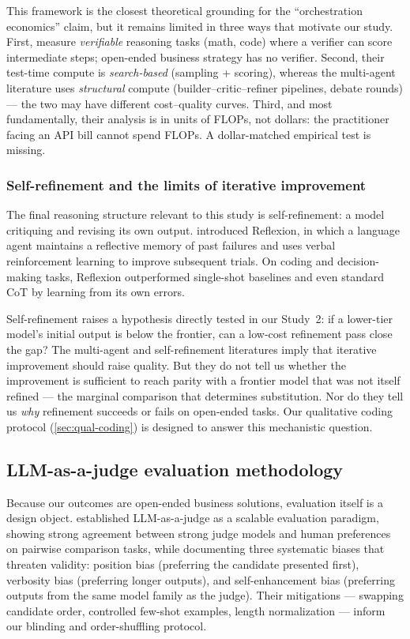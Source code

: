 \documentclass[12pt,a4paper]{article}
\begin{document}
This framework is the closest theoretical grounding for the ``orchestration
economics'' claim, but it remains limited in three ways that motivate our study.
First, \citet{SnellEtAl2024} measure \emph{verifiable} reasoning tasks (math,
code) where a verifier can score intermediate steps; open-ended business
strategy has no verifier. Second, their test-time compute is
\emph{search-based} (sampling + scoring), whereas the multi-agent literature
uses \emph{structural} compute (builder--critic--refiner pipelines, debate
rounds) --- the two may have different cost--quality curves. Third, and most
fundamentally, their analysis is in units of FLOPs, not dollars: the
practitioner facing an API bill cannot spend FLOPs. A dollar-matched empirical
test is missing.

\subsubsection{Self-refinement and the limits of iterative improvement}

The final reasoning structure relevant to this study is self-refinement: a
model critiquing and revising its own output. \citet{ShinnEtAl2023} introduced
Reflexion, in which a language agent maintains a reflective memory of past
failures and uses verbal reinforcement learning to improve subsequent trials.
On coding and decision-making tasks, Reflexion outperformed single-shot
baselines and even standard CoT by learning from its own errors.

Self-refinement raises a hypothesis directly tested in our Study~2: if a lower-tier
model's initial output is below the frontier, can a low-cost refinement pass close
the gap? The multi-agent and self-refinement literatures imply that iterative
improvement should raise quality. But they do not tell us whether the
improvement is sufficient to reach parity with a frontier model that was not
itself refined --- the marginal comparison that determines substitution. Nor do
they tell us \emph{why} refinement succeeds or fails on open-ended tasks. Our
qualitative coding protocol (\cref{sec:qual-coding}) is designed to answer this
mechanistic question.

\subsection{LLM-as-a-judge evaluation methodology}

Because our outcomes are open-ended business solutions, evaluation itself is a
design object. \citet{ZhengEtAl2023} established LLM-as-a-judge as a scalable
evaluation paradigm, showing strong agreement between strong judge models and
human preferences on pairwise comparison tasks, while documenting three
systematic biases that threaten validity: position bias (preferring the
candidate presented first), verbosity bias (preferring longer outputs), and
self-enhancement bias (preferring outputs from the same model family as the
judge). Their mitigations --- swapping candidate order, controlled few-shot
examples, length normalization --- inform our blinding and order-shuffling
protocol.
\end{document}
